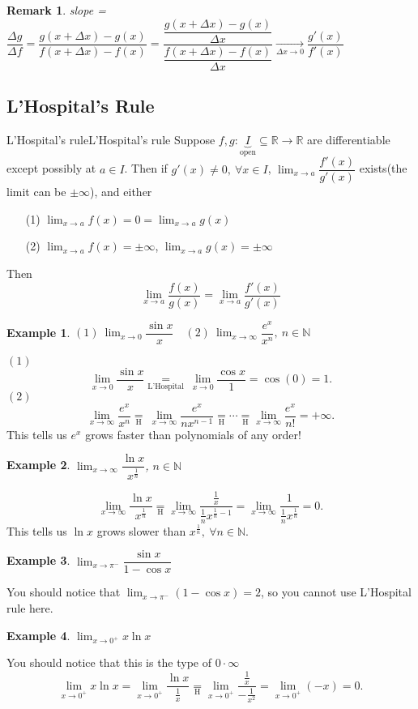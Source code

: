 \documentclass[12pt,a4paper]{article}
\newcommand{\R}{\mathbb{R}}
\newcommand{\N}{\mathbb{N}}
\newcommand{\undereq}[1]{\underset{\text{#1}}{=}}
\newcommand{\dlim}[1]{\displaystyle\lim_{#1}}
\theoremstyle{mystyle}
\numberwithin{figure}{subsection}
\newtheorem{exm}{Example}[subsection] %
\newtheorem{rem}{Remark}[subsection] %
\newenvironment{ex}{\begin{exBox}\begin{exm}}{\end{exm}\end{exBox}}
\begin{document}
\begin{rem}
slope = $\dfrac{\Delta g}{\Delta f}=\dfrac{g(x+\Delta x)-g(x)}{f(x+\Delta x)-f(x)}=\dfrac{\dfrac{g(x+\Delta x)-g(x)}{\Delta x}}{\dfrac{f(x+\Delta x)-f(x)}{\Delta x}} \xrightarrow[\Delta x \to 0]{} \dfrac{g'(x)}{f'(x)}$
\end{rem}
\newpage
\subsection{L'Hospital's Rule}
\begin{thm}{L'Hospital's rule}{L'Hospital's rule}
    Suppose $f,g: \underbrace{I}_{\text{open}} \subseteq \R \longrightarrow \R$ are differentiable except possibly at $a \in I$. Then if $g'(x) \neq 0, \ \forall x \in I$, $\dlim{x \to a}\dfrac{f'(x)}{g'(x)}$ exists(the limit can be $\pm \infty$), and either
    \begin{itemize}
        \item [(1)] $\dlim{x \to a}f(x)=0=\dlim{x \to a}g(x)$
        \item[(2)] $\dlim{x \to a}f(x)=\pm\infty$, $\dlim{x \to a}g(x)=\pm\infty$
    \end{itemize}
    Then
    \[
    \dlim{x \to a}\dfrac{f(x)}{g(x)} = \dlim{x \to a}\dfrac{f'(x)}{g'(x)}
    \]
\end{thm}
\begin{ex}
$(1) \ \dlim{x \to 0}\dfrac{\sin x}{x}\quad (2) \ \dlim{x \to \infty}\dfrac{e^x}{x^n}, \ n \in \N$
\end{ex}
$(1)$
\[
\dlim{x \to 0}\dfrac{\sin x}{x} \underset{\text{L'Hospital}}{=}  \ \dlim{x \to 0} \dfrac{\cos x}{1} = \cos (0) = 1.
\]
$(2)$
\[
\dlim{x \to \infty}\dfrac{e^x}{x^n} \underset{\text{H}}{=} \ \dlim{x \to \infty}\dfrac{e^x}{nx^{n-1}} \underset{\text{H}}{=} \cdots \undereq{H}\dlim{x \to \infty}\dfrac{e^x}{n!}=+\infty.
\]
This tells us $e^x$ grows faster than polynomials of any order!
\begin{ex}
$\dlim{x \to \infty}\dfrac{\ln x}{x^{\frac{1}{n}}}$, $n \in \N$
\end{ex}
\[
    \dlim{x \to \infty}\dfrac{\ln x}{x^{\frac{1}{n}}} \underset{\text{H}}{=} \dlim{x \to \infty}\dfrac{\frac{1}{x}}{\frac{1}{n}x^{\frac{1}{n}-1}}=\dlim{x \to \infty}\dfrac{1}{\frac{1}{n}x^{\frac{1}{n}}}=0.
\]
This tells us $\ln x$ grows slower than $x^{\frac{1}{n}}, \ \forall n \in \N.$
\begin{ex}
$\dlim{x \to \pi^-}\dfrac{\sin x}{1-\cos x}$
\end{ex}
You should notice that $\dlim{x \to \pi^-}(1-\cos x)=2$, so you cannot use L'Hospital rule here.
\begin{ex}
$\dlim{x \to 0^+} x\ln x$
\end{ex}
You should notice that this is the type of $0 \cdot \infty$
\[
\dlim{x \to 0^+} x \ln x = \dlim{x \to 0^+} \dfrac{\ln x}{\frac{1}{x}} \undereq{H} \dlim{x \to 0^+}\dfrac{\frac{1}{x}}{-\frac{1}{x^2}}=\dlim{x \to 0^+}(-x)=0.
\]
 
\end{document}
